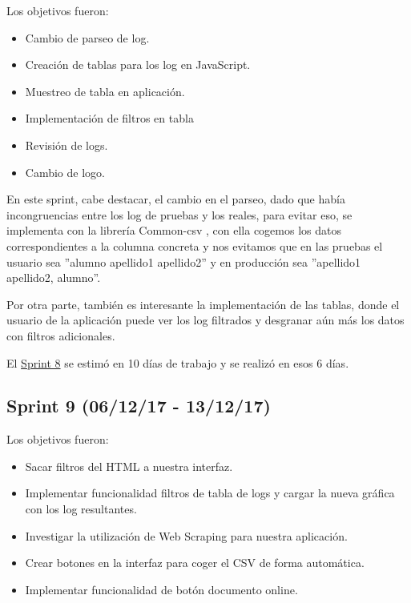 Los objetivos fueron:
\begin{itemize}
	\tightlist
	\item
	Cambio de parseo de log.
	\item
	Creación de tablas para los log en JavaScript.
	\item
	Muestreo de tabla en aplicación.
	\item
	Implementación de filtros en tabla
	\item
	Revisión de logs.
	\item
	Cambio de logo.
	
\end{itemize}

En este sprint, cabe destacar, el cambio en el parseo, dado que había incongruencias entre los log de pruebas y los reales, para evitar eso, se implementa con la librería Common-csv \cite{Java:csv}, con ella cogemos los datos correspondientes a la columna concreta y nos evitamos que en las pruebas el usuario sea ''alumno apellido1 apellido2'' y en producción sea ''apellido1 apellido2, alumno''.

Por otra parte, también es interesante la implementación de las tablas, donde el usuario de la aplicación puede ver los log filtrados y desgranar aún más los datos con filtros adicionales.

El \href{https://github.com/trona85/GII-17.1B-UBULog-1.0/milestone/8?closed=1}{Sprint 8} se estimó en 10 días de trabajo y se realizó en esos 6 días.


\subsection{Sprint 9 (06/12/17 -
	13/12/17)}\label{sprint-9-061217---131217}

Los objetivos fueron:
\begin{itemize}
	\tightlist
	\item
	Sacar filtros del HTML a nuestra interfaz.
	\item
	Implementar funcionalidad filtros de tabla de logs y cargar la nueva gráfica con los log resultantes.
	\item
	Investigar la utilización de Web Scraping para nuestra aplicación.
	\item
	Crear botones en la interfaz para coger el CSV de forma automática.
	\item
	Implementar funcionalidad de botón documento online.
	
\end{itemize}

